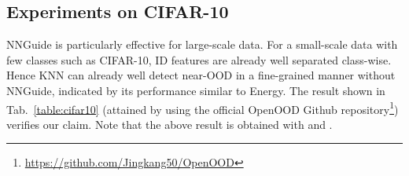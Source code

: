 \documentclass[10pt,twocolumn,letterpaper]{article}
\begin{document}
\subsection{Experiments on CIFAR-10}

\begin{table}[t]
\centering
{}
\caption{The result of NNGuide on CIFAR-10 (ID) in (FPR95 / AUROC)}
\label{table:cifar10}
\end{table}

NNGuide is particularly effective for large-scale data. For a small-scale data with few classes such as CIFAR-10, ID features are already well separated class-wise. Hence KNN can already well detect near-OOD in a fine-grained manner without NNGuide, indicated by its performance similar to Energy. 
The result shown in Tab.~\ref{table:cifar10} (attained by using the official OpenOOD Github repository\footnote{\url{https://github.com/Jingkang50/OpenOOD}}) verifies our claim.
Note that the above result is obtained with  and .





\clearpage
\twocolumn
\end{document}
